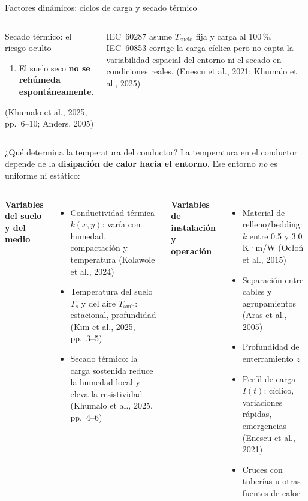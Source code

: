 \documentclass[aspectratio=169]{beamer}
\newcommand{\refcite}[1]{{\footnotesize\color{gray!70!black} #1}}
\begin{document}
\begin{frame}{Factores dinámicos: ciclos de carga y secado térmico}
\begin{columns}[T]
\begin{alertblock}{\small Secado térmico: el riesgo oculto}
\begin{enumerate}[leftmargin=*,itemsep=0pt]
    \item El suelo seco \textbf{no se rehúmeda espontáneamente}.
\end{enumerate}
\refcite{(Khumalo et al., 2025, pp.~6--10; Anders, 2005)}
\end{alertblock}
\vspace{0.15em}
\begin{exampleblock}{}\scriptsize
IEC~60287 asume $T_\text{suelo}$ fija y carga al 100\,\%.
IEC~60853 corrige la carga cíclica pero no capta la variabilidad
espacial del entorno ni el secado en condiciones reales.
\refcite{(Enescu et al., 2021; Khumalo et al., 2025)}
\end{exampleblock}
\end{columns}
\end{frame}

\begin{frame}{¿Qué determina la temperatura del conductor?}
\justifying\small
La temperatura en el conductor depende de la \textbf{disipación de calor hacia
el entorno}. Ese entorno \emph{no} es uniforme ni estático:

\vspace{0.2em}
\begin{columns}[T]
\textbf{\small Variables del suelo y del medio}
\begin{itemize}[leftmargin=*]\scriptsize
    \item Conductividad térmica $k(x,y)$: varía con humedad,
          compactación y temperatura \refcite{(Kolawole et al., 2024)}
    \item Temperatura del suelo $T_s$ y del aire $T_\text{amb}$:
          estacional, profundidad \refcite{(Kim et al., 2025, pp.~3--5)}
    \item Secado térmico: la carga sostenida reduce la humedad local y
          eleva la resistividad
          \refcite{(Khumalo et al., 2025, pp.~4--6)}
\end{itemize}
\textbf{\small Variables de instalación y operación}
\begin{itemize}[leftmargin=*]\scriptsize
    \item Material de relleno/bedding: $k$ entre 0.5 y 3.0 K·m/W
          \refcite{(Ocłoń et al., 2015)}
    \item Separación entre cables y agrupamientos
          \refcite{(Aras et al., 2005)}
    \item Profundidad de enterramiento $z$
    \item Perfil de carga $I(t)$: cíclico, variaciones rápidas, emergencias
          \refcite{(Enescu et al., 2021)}
    \item Cruces con tuberías u otras fuentes de calor
\end{itemize}
\end{columns}


\end{frame}
\end{document}
